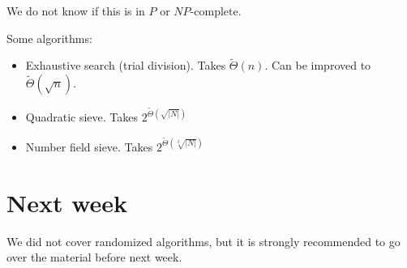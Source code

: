 \documentclass{idc_msc}
\begin{document}
We do not know if this is in \(P\) or \(\textit{NP}\textrm{-complete}\).

Some algorithms:

\begin{itemize}
  \item Exhaustive search (trial division). Takes \(\widetilde{\Theta}(n)\). Can be improved to \(\widetilde{\Theta}(\sqrt{n})\).
  \item Quadratic sieve. Takes \(2^{\widetilde{\Theta}(\sqrt{|N|})}\)
  \item Number field sieve. Takes \(2^{\widetilde{\Theta}(\sqrt[3]{|N|})}\)
\end{itemize}

\section{Next week}

We did not cover randomized algorithms, but it is strongly recommended to go over the material before next week.
\end{document}
